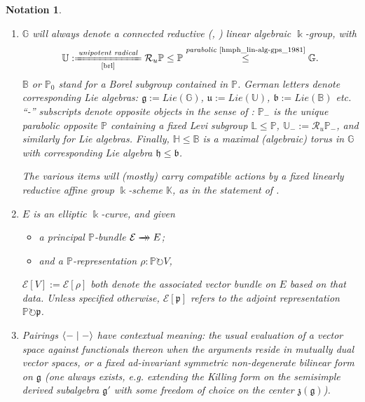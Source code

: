 \documentclass[11pt,leqno]{article}
\theoremstyle{plain}
\theoremstyle{plain}
\theoremstyle{plain}
\newtheorem{notation}[lemma]{Notation}
\numberwithin{equation}{section}
\theoremstyle{nonumberplain}
\newcommand\bB{{\mathbb B}}
\newcommand\bG{{\mathbb G}}
\newcommand\bH{{\mathbb H}}
\newcommand\bK{{\mathbb K}}
\newcommand\bL{{\mathbb L}}
\newcommand\bP{{\mathbb P}}
\newcommand\bU{{\mathbb U}}
\newcommand\cE{{\mathcal E}}
\newcommand\cR{{\mathcal R}}
\newcommand\fb{{\mathfrak b}}
\newcommand\fg{{\mathfrak g}}
\newcommand\fh{{\mathfrak h}}
\newcommand\fp{{\mathfrak p}}
\newcommand\fu{{\mathfrak u}}
\newcommand\fz{{\mathfrak z}}
\newcommand\1{{\bf 1}}
\newcommand{\xrightarrowdbl}[2][]{%
  \xrightarrow[#1]{#2}\mathrel{\mkern-14mu}\rightarrow
}
\begin{document}
\begin{notation}\label{not:gp}
  \begin{enumerate}[(1),wide]
  \item\label{item:not:gp:gpb} $\bG$ will always denote a connected \emph{reductive} (\cite[\S 19.5]{hmph_lin-alg-gps_1981}, \cite[\S IV.11.21]{brl}) linear algebraic $\Bbbk$-group, with
    \begin{equation*}
      \bU
      :\xlongequal[\text{\cite[\S IV.11.21]{brl}}]{\text{\emph{unipotent radical}}}
      \cR_u\bP
      \le
      \bP
      \overset{\text{\emph{parabolic} \cite[\S 29.3, p.179]{hmph_lin-alg-gps_1981}}}{\le}
      \bG.
    \end{equation*}
    $\bB$ or $\bP_0$ stand for a \emph{Borel} subgroup contained in $\bP$. German letters denote corresponding Lie algebras: $\fg:=Lie(\bG)$, $\fu:=Lie(\bU)$, $\fb:=Lie(\bB)$ etc. ``-'' subscripts denote \emph{opposite} objects in the sense of \cite[\S IV.14.20]{brl}: $\bP_-$ is the unique \cite[Theorem IV.14.21]{brl} parabolic opposite $\bP$ containing a fixed \emph{Levi subgroup} $\bL\le \bP$, $\bU_-:=\cR_u\bP_-$, and similarly for Lie algebras. Finally, $\bH\le \bB$ is a maximal (algebraic) torus in $\bG$ with corresponding Lie algebra $\fh\le \fb$. 
    
    The various items will (mostly) carry compatible actions by a fixed linearly reductive affine group $\Bbbk$-scheme $\bK$, as in the statement of .
    
  \item $E$ is an elliptic $\Bbbk$-curve, and given
    \begin{itemize}[wide]
    \item a principal $\bP$-bundle $\cE\xrightarrowdbl{} E$;
    \item and a $\bP$-representation $\rho:\bP\circlearrowright V$,
    \end{itemize}
    $\cE[V]:=\cE[\rho]$ both denote the associated \cite[Definition 5.3.1]{hjjm_bdle} vector bundle on $E$ based on that data. Unless specified otherwise, $\cE[\fp]$ refers to the adjoint representation $\bP\circlearrowright \fp$.

  \item Pairings $\Braket{-\mid -}$ have contextual meaning: the usual evaluation of a vector space against functionals thereon when the arguments reside in mutually dual vector spaces, or a fixed ad-invariant symmetric non-degenerate bilinear form on $\fg$ (one always exists, e.g. extending the Killing form on the semisimple derived subalgebra $\fg'$ with some freedom of choice on the center $\fz(\fg)$).      
  \end{enumerate}
\end{notation}
\end{document}
